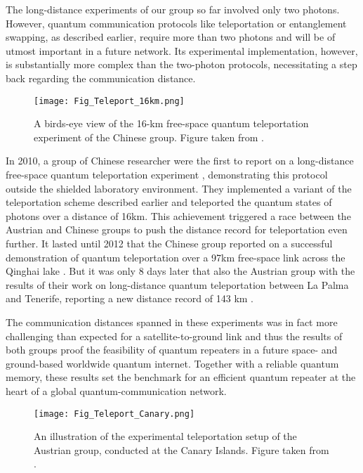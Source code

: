 \documentclass{article}
\begin{document}
The long-distance experiments of our group so far involved only two photons. However, quantum communication protocols like teleportation or entanglement swapping, as described earlier, require more than two photons and will be of utmost important in a future network. Its experimental implementation, however, is substantially more complex than the two-photon protocols, necessitating a step back regarding the communication distance.
\begin{figure}[h!]
\centering
\texttt{[image: Fig\_Teleport\_16km.png]}
\caption{A birds-eye view of the 16-km free-space quantum teleportation experiment of the Chinese group. Figure taken from \cite{jin2010experimental}.}
\label{fig:Fig_Teleport_Qinghai}
\end{figure}
In 2010, a group of Chinese researcher were the first to report on a long-distance free-space quantum teleportation experiment \cite{jin2010experimental}, demonstrating this protocol outside the shielded laboratory environment. They implemented a variant of the teleportation scheme described earlier and teleported the quantum states of photons over a distance of 16km. This achievement triggered a race between the Austrian and Chinese groups to push the distance record for teleportation even further. It lasted until 2012 that the Chinese group reported on a successful demonstration of quantum teleportation over a 97km free-space link across the Qinghai lake \cite{yin2012quantum}. But it was only 8 days later that also the Austrian group with the results of their work on long-distance quantum teleportation between La Palma and Tenerife, reporting a new distance record of 143 km \cite{ma2012quantum}.

The communication distances spanned in these experiments was in fact more challenging than expected for a satellite-to-ground link and thus the results of both groups proof the feasibility of quantum repeaters in a future space- and ground-based worldwide quantum internet. Together with a reliable quantum memory, these results set the benchmark for an efficient quantum repeater at the heart of a global quantum-communication network.

\begin{figure}[h!]
\centering
\texttt{[image: Fig\_Teleport\_Canary.png]}
\caption{An illustration of the experimental teleportation setup of the Austrian group, conducted at the Canary Islands. Figure taken from \cite{ma2012quantum}.}
\label{fig:Fig_Teleport_Canary}
\end{figure}
\end{document}
